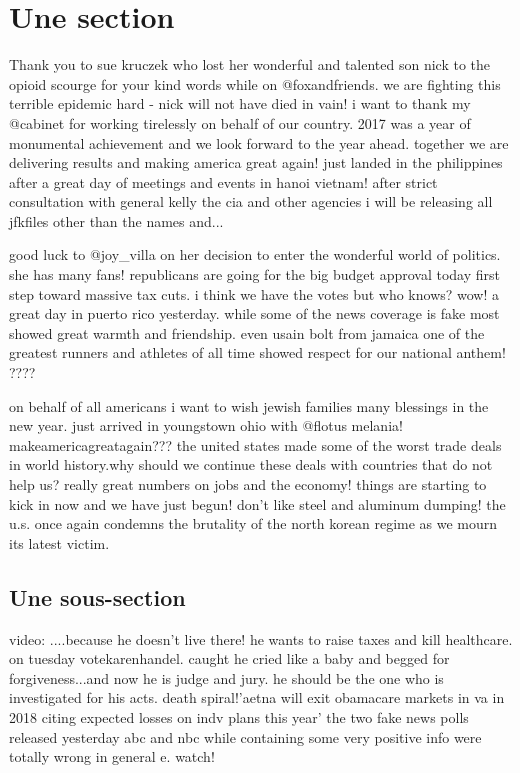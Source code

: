 \documentclass[10pt,twoside,fleqn,english,french]{actuecon}
\begin{document}
		\section{Une section}
		
		Thank you to sue kruczek who lost her wonderful and talented son nick to the opioid scourge for your kind words while on
		@foxandfriends. we are fighting this terrible epidemic hard - nick will not have died in vain! i want to thank my @cabinet
		for working tirelessly on behalf of our country. 2017 was a year of monumental achievement and we look forward to the year
		ahead. together we are delivering results and making america great again! just landed in the philippines after a great day
		of meetings and events in hanoi vietnam! after strict consultation with general kelly the cia and other agencies i will be
		releasing all jfkfiles other than the names and...
		
		good luck to @joy\_villa on her decision to enter the wonderful world of
		politics. she has many fans! republicans are going for the big budget approval today first step toward massive tax cuts. i
		think we have the votes but who knows? wow! a great day in puerto rico yesterday. while some of the news coverage is fake
		most showed great warmth and friendship. even usain bolt from jamaica one of the greatest runners and athletes of all time
		showed respect for our national anthem! ???? 
		
		on behalf of all americans i want to wish jewish families many blessings in
		the new year. just arrived in youngstown ohio with @flotus melania! makeamericagreatagain??? the united states made some of
		the worst trade deals in world history.why should we continue these deals with countries that do not help us? really great
		numbers on jobs and the economy! things are starting to kick in now and we have just begun! don't like steel and aluminum
		dumping! the u.s. once again condemns the brutality of the north korean regime as we mourn its latest victim.
		
		\subsection{Une sous-section}
		
		video: ....because he doesn't live there! he wants to raise taxes and kill healthcare. on tuesday votekarenhandel. caught he
		cried like a baby and begged for forgiveness...and now he is judge and jury. he should be the one who is investigated for his
		acts. death spiral!'aetna will exit obamacare markets in va in 2018 citing expected losses on indv plans this year' the two
		fake news polls released yesterday abc and nbc while containing some very positive info were totally wrong in general e.
		watch! 
		
\end{document}
